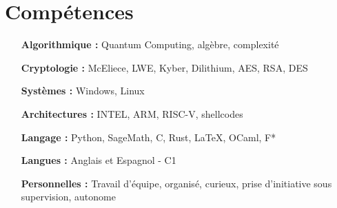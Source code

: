   \section{Compétences}

  \begin{multicols}{2}
    \begin{itemize}[itemsep=-2px, parsep=1pt, leftmargin=75pt]
      \item[\textbf{Algorithmique :}] Quantum Computing, algèbre, complexité
      \item[\textbf{Cryptologie :}] McEliece, LWE, Kyber, Dilithium, AES, RSA, DES
      \item[\textbf{Systèmes :}] Windows, Linux
      \item[\textbf{Architectures :}] INTEL, ARM, RISC-V, shellcodes
      
      \item[\textbf{Langage :}] Python, SageMath, C, Rust, LaTeX, OCaml, F*
      \item[\textbf{Langues :}] Anglais et Espagnol - C1
      \item[\textbf{Personnelles :}] Travail d'équipe, organisé, curieux, prise d'initiative sous supervision, autonome
    \end{itemize}
  \end{multicols}


